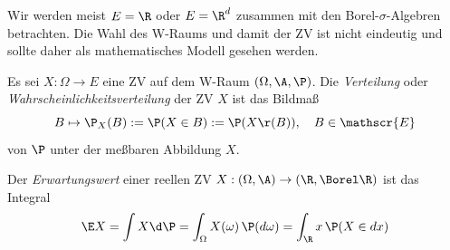 \documentclass[11pt, a4paper]{article}
\begin{document}
\begin{note}
    Wir werden meist $E = \R$ oder $E = \R^d$ zusammen mit den Borel-$\sigma$-Algebren betrachten. Die Wahl des W-Raums und damit der ZV ist nicht eindeutig und sollte daher als mathematisches Modell gesehen werden.
\end{note}


\begin{definition}
    Es sei $X: \Omega \to E$ eine ZV auf dem W-Raum $(\Omega, \A, \P)$. Die \emph{Verteilung} oder \emph{Wahrscheinlichkeitsverteilung} der ZV $X$ ist das Bildmaß
    $$B \mapsto \P_X(B) := \P(X \in B) := \P(X\r(B)), \quad B \in \mathscr{E}$$
    von $\P$ unter der meßbaren Abbildung $X$.

    Der \emph{Erwartungswert} einer reellen ZV $X: (\Omega, \A) \to (\R, \Borel \R)$ ist das Integral
    $$\E X = \int X \d\P = \int_\Omega X(\omega) \, \P(d\omega) = \int_\R x \, \P(X \in dx)$$
\end{definition}
\end{document}
